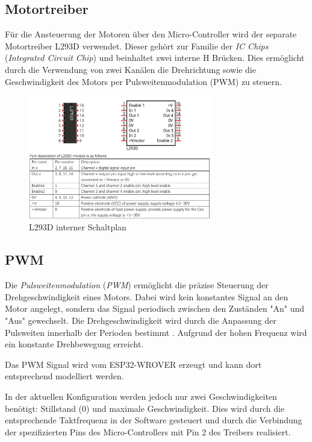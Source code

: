 \documentclass[conference,compsoc,final,a4paper]{IEEEtran}
\begin{document}
\subsection{Motortreiber}

Für die Ansteuerung der Motoren über den Micro-Controller wird der separate Motortreiber L293D verwendet.
Dieser gehört zur Familie der \emph{IC Chips} (\emph{Integrated Circuit Chip}) und beinhaltet zwei interne H Brücken. Dies ermöglicht durch die Verwendung von zwei Kanälen die Drehrichtung 
sowie die Geschwindigkeit des Motors per Pulsweitenmodulation (PWM)  zu steuern.

\begin{figure}[h]
  \centering
\includegraphics[width=8cm]{../images/L293D.png}
\caption{L293D interner Schaltplan \autocite{freenoveTutorial}}\label{Elektrik:L293D}
\end{figure}

\subsection{PWM}
Die \emph{Pulsweitenmodulation} (\emph{PWM}) ermöglicht die präzise Steuerung der Drehgeschwindigkeit eines Motors. Dabei wird kein konstantes Signal an den Motor angelegt,
sondern das Signal periodisch zwischen den Zuständen "An" und "Aus" gewechselt. Die Drehgeschwindigkeit wird durch die Anpassung der Pulsweiten innerhalb der Perioden 
bestimmt \autocite{611797}. Aufgrund der hohen Frequenz wird ein konstante Drehbewegung erreicht. 

\noindent Das PWM Signal wird vom ESP32-WROVER erzeugt und kann dort entsprechend modelliert werden. 

\noindent In der aktuellen Konfiguration werden jedoch nur zwei Geschwindigkeiten benötigt: Stillstand (0) und maximale Geschwindigkeit. 
Dies wird durch die entsprechende Taktfrequenz in der Software gesteuert und durch die Verbindung der 
spezifizierten Pins des Micro-Controllers mit Pin 2 des Treibers realisiert.
\end{document}
